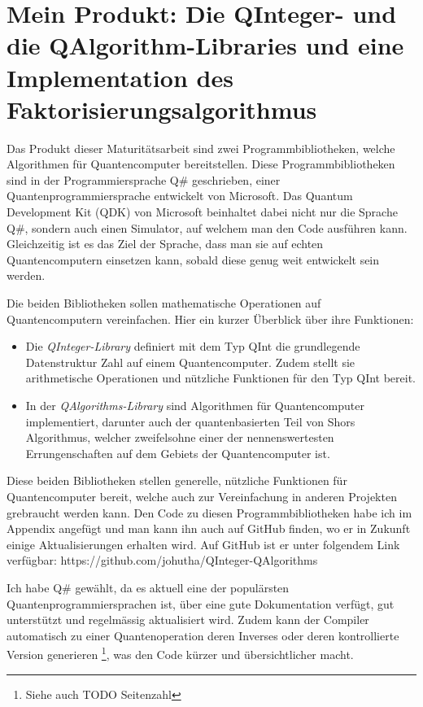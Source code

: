 \section{Mein Produkt: Die QInteger- und die QAlgorithm-Libraries und eine Implementation des Faktorisierungsalgorithmus}
Das Produkt dieser Maturitätsarbeit sind zwei Programmbibliotheken, welche Algorithmen für Quantencomputer bereitstellen. Diese Programmbibliotheken sind in der Programmiersprache Q\# geschrieben, einer Quantenprogrammiersprache entwickelt von Microsoft. Das Quantum Development Kit (QDK) von Microsoft beinhaltet dabei nicht nur die Sprache Q\#, sondern auch einen Simulator, auf welchem man den Code ausführen kann. Gleichzeitig ist es das Ziel der Sprache, dass man sie auf echten Quantencomputern einsetzen kann, sobald diese genug weit entwickelt sein werden.

Die beiden Bibliotheken sollen mathematische Operationen auf Quantencomputern vereinfachen. Hier ein kurzer Überblick über ihre Funktionen: %
\begin{itemize}
  \item Die \textit{QInteger-Library} definiert mit dem Typ \grqq QInt\grqq{} die grundlegende Datenstruktur \grqq Zahl\grqq{} auf einem Quantencomputer. Zudem stellt sie arithmetische Operationen und nützliche Funktionen für den Typ \grqq QInt\grqq{} bereit. %
  \item In der \textit{QAlgorithms-Library} sind Algorithmen für Quantencomputer implementiert, darunter auch der quantenbasierten Teil von Shors Algorithmus, welcher zweifelsohne einer der nennenswertesten Errungenschaften auf dem Gebiets der Quantencomputer ist.
\end{itemize}
Diese beiden Bibliotheken stellen generelle, nützliche Funktionen für Quantencomputer bereit, welche auch zur Vereinfachung in anderen Projekten grebraucht werden kann. Den Code zu diesen Programmbibliotheken habe ich im Appendix angefügt und man kann ihn auch auf GitHub finden, wo er in Zukunft einige Aktualisierungen erhalten wird. Auf GitHub ist er unter folgendem Link verfügbar: https://github.com/johutha/QInteger-QAlgorithms

Ich habe Q\# gewählt, da es aktuell eine der populärsten Quantenprogrammiersprachen ist, über eine gute Dokumentation verfügt, gut unterstützt und regelmässig aktualisiert wird. Zudem kann der Compiler automatisch zu einer Quantenoperation deren Inverses oder deren kontrollierte Version generieren \footnote{Siehe auch TODO Seitenzahl}, was den Code kürzer und übersichtlicher macht.


